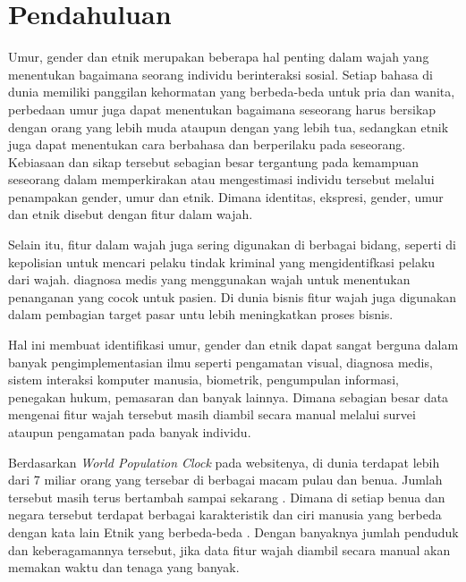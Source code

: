 \section{Pendahuluan}
\label{sec:pendahuluan}


Umur, gender dan etnik merupakan beberapa hal penting dalam wajah yang menentukan bagaimana seorang 
individu berinteraksi sosial. Setiap bahasa di dunia memiliki panggilan kehormatan yang berbeda-beda 
untuk pria dan wanita, perbedaan umur juga dapat menentukan bagaimana seseorang harus bersikap dengan 
orang yang lebih muda ataupun dengan yang lebih tua, sedangkan etnik juga dapat menentukan cara berbahasa 
dan berperilaku pada seseorang. Kebiasaan dan sikap tersebut sebagian besar tergantung pada kemampuan 
seseorang dalam memperkirakan atau mengestimasi individu tersebut melalui penampakan gender, umur dan 
etnik. Dimana identitas, ekspresi, gender, umur dan etnik disebut dengan fitur dalam wajah. \par
Selain itu, fitur dalam wajah juga sering digunakan di berbagai bidang, seperti di kepolisian untuk 
mencari pelaku tindak kriminal yang mengidentifkasi pelaku dari wajah. diagnosa medis yang menggunakan 
wajah untuk menentukan penanganan yang cocok untuk pasien. Di dunia bisnis fitur wajah juga digunakan 
dalam pembagian target pasar untu lebih meningkatkan proses bisnis. \par
Hal ini membuat identifikasi umur, gender dan etnik dapat sangat berguna dalam banyak pengimplementasian 
ilmu seperti pengamatan visual, diagnosa medis, sistem interaksi komputer manusia, biometrik, pengumpulan 
informasi, penegakan hukum, pemasaran dan banyak lainnya. Dimana sebagian besar data mengenai fitur wajah 
tersebut masih diambil secara manual melalui survei ataupun pengamatan pada banyak individu. \par
Berdasarkan \textit{World Population Clock} pada websitenya, di dunia terdapat lebih dari 7 miliar orang yang 
tersebar di berbagai macam pulau dan benua. Jumlah tersebut masih terus bertambah sampai sekarang \citep{Worldometer}.
Dimana di setiap benua dan negara tersebut terdapat berbagai karakteristik dan ciri manusia yang berbeda 
dengan kata lain Etnik yang berbeda-beda \citep{Infoplease}. Dengan banyaknya jumlah penduduk dan keberagamannya tersebut, 
jika data fitur wajah diambil secara manual akan memakan waktu dan tenaga yang banyak.
